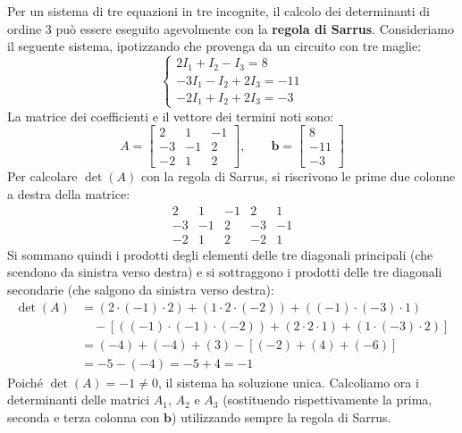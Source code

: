 Per un sistema di tre equazioni in tre incognite, il calcolo dei determinanti di ordine 3 può essere eseguito agevolmente con la \textbf{regola di Sarrus}. Consideriamo il seguente sistema, ipotizzando che provenga da un circuito con tre maglie:
\begin{equation}
\begin{cases}
2 I_1 + I_2 - I_3 = 8 \\
-3 I_1 - I_2 + 2 I_3 = -11 \\
-2 I_1 + I_2 + 2 I_3 = -3
\end{cases}
\label{eq:sistema_3x3_esempio}
\end{equation}
La matrice dei coefficienti e il vettore dei termini noti sono:
\begin{equation}
A = \begin{bmatrix}
2 & 1 & -1 \\
-3 & -1 & 2 \\
-2 & 1 & 2
\end{bmatrix},\qquad
\mathbf{b} = \begin{bmatrix}
8 \\ -11 \\ -3
\end{bmatrix}
\label{eq:matrice_3x3_esempio}
\end{equation}
Per calcolare \(\det(A)\) con la regola di Sarrus, si riscrivono le prime due colonne a destra della matrice:
\[
\begin{array}{ccc|cc}
2 & 1 & -1 & 2 & 1 \\
-3 & -1 & 2 & -3 & -1 \\
-2 & 1 & 2 & -2 & 1
\end{array}
\]
Si sommano quindi i prodotti degli elementi delle tre diagonali principali (che scendono da sinistra verso destra) e si sottraggono i prodotti delle tre diagonali secondarie (che salgono da sinistra verso destra):
\begin{align}
\det(A) &= (2 \cdot (-1) \cdot 2) + (1 \cdot 2 \cdot (-2)) + ((-1) \cdot (-3) \cdot 1) \nonumber \\
        &\quad - [((-1) \cdot (-1) \cdot (-2)) + (2 \cdot 2 \cdot 1) + (1 \cdot (-3) \cdot 2)] \nonumber \\
        &= (-4) + (-4) + (3) - [(-2) + (4) + (-6)] \nonumber \\
        &= -5 - (-4) = -5 + 4 = -1
\label{eq:detA_3x3}
\end{align}
Poiché \(\det(A) = -1 \neq 0\), il sistema ha soluzione unica. Calcoliamo ora i determinanti delle matrici \(A_1\), \(A_2\) e \(A_3\) (sostituendo rispettivamente la prima, seconda e terza colonna con \(\mathbf{b}\)) utilizzando sempre la regola di Sarrus.

